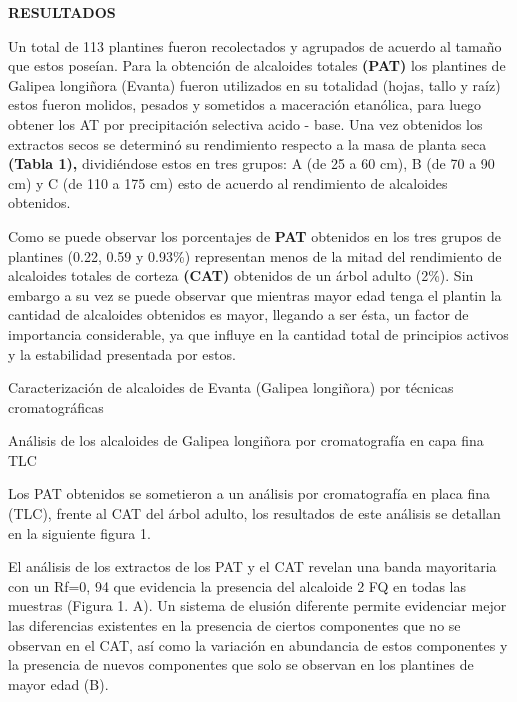 \documentclass{article}
\begin{document}
\textbf{RESULTADOS}

Un total de 113 plantines fueron recolectados y agrupados de acuerdo al tamaño
que estos poseían. Para la obtención de alcaloides totales \textbf{(PAT) }
los plantines de Galipea longiñora (Evanta) fueron utilizados en su totalidad
(hojas, tallo y raíz) estos fueron molidos, pesados y sometidos a maceración
etanólica, para luego obtener los AT por precipitación selectiva acido - base.
Una vez obtenidos los extractos secos se determinó su rendimiento respecto a la
masa de planta seca \textbf{(Tabla 1), }
dividiéndose estos en tres grupos: A (de 25 a 60 cm), B (de 70 a 90 cm) y C (de
110 a 175 cm) esto de acuerdo al rendimiento de alcaloides obtenidos.

Como se puede observar los porcentajes de \textbf{PAT }
obtenidos en los tres grupos de plantines (0.22, 0.59 y 0.93\%) representan
menos de la mitad del rendimiento de alcaloides totales de corteza \textbf{(CAT)
}
obtenidos de un árbol adulto (2\%). Sin embargo a su vez se puede observar que
mientras mayor edad tenga el plantin la cantidad de alcaloides obtenidos es
mayor, llegando a ser ésta, un factor de importancia considerable, ya que
influye en la cantidad total de principios activos y la estabilidad presentada
por estos.

Caracterización de alcaloides de Evanta (Galipea longiñora) por técnicas
cromatográficas

Análisis de los alcaloides de Galipea longiñora por cromatografía en capa fina
TLC

Los PAT obtenidos se sometieron a un análisis por cromatografía en placa fina
(TLC), frente al CAT del árbol adulto, los resultados de este análisis se
detallan en la siguiente figura 1.

\begin{Center}

\end{Center}

\begin{Center}

\end{Center}

El análisis de los extractos de los PAT y el CAT revelan una banda mayoritaria
con un Rf=0, 94 que evidencia la presencia del alcaloide 2 FQ en todas las
muestras (Figura 1. A). Un sistema de elusión diferente permite evidenciar mejor
las diferencias existentes en la presencia de ciertos componentes que no se
observan en el CAT, así como la variación en abundancia de estos componentes y
la presencia de nuevos componentes que solo se observan en los plantines de
mayor edad (B).
\end{document}

